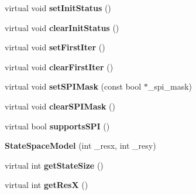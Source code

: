 \begin{DoxyCompactItemize}
\item 
\hypertarget{classStateSpaceModel_a5a7a1a38551522e1877b453062fc0f1f}{virtual void {\bfseries set\-Init\-Status} ()}\label{classStateSpaceModel_a5a7a1a38551522e1877b453062fc0f1f}

\item 
\hypertarget{classStateSpaceModel_a9d9b5a754b969d02d1881f10945baad6}{virtual void {\bfseries clear\-Init\-Status} ()}\label{classStateSpaceModel_a9d9b5a754b969d02d1881f10945baad6}

\item 
\hypertarget{classStateSpaceModel_a7b56124a6faf2aea497050f697757806}{virtual void {\bfseries set\-First\-Iter} ()}\label{classStateSpaceModel_a7b56124a6faf2aea497050f697757806}

\item 
\hypertarget{classStateSpaceModel_a6eee4ed388bc0d8c7ce0b668cb67599f}{virtual void {\bfseries clear\-First\-Iter} ()}\label{classStateSpaceModel_a6eee4ed388bc0d8c7ce0b668cb67599f}

\item 
\hypertarget{classStateSpaceModel_a437deb778661e9202e42f3a636c33dea}{virtual void {\bfseries set\-S\-P\-I\-Mask} (const bool $\ast$\-\_\-spi\-\_\-mask)}\label{classStateSpaceModel_a437deb778661e9202e42f3a636c33dea}

\item 
\hypertarget{classStateSpaceModel_a5d474f0a621659071be9bd0cdf37136d}{virtual void {\bfseries clear\-S\-P\-I\-Mask} ()}\label{classStateSpaceModel_a5d474f0a621659071be9bd0cdf37136d}

\item 
\hypertarget{classStateSpaceModel_a43c5fa9bdbd4d33422102da5112b7cc7}{virtual bool {\bfseries supports\-S\-P\-I} ()}\label{classStateSpaceModel_a43c5fa9bdbd4d33422102da5112b7cc7}

\item 
\hypertarget{classStateSpaceModel_a886da7a357a17c286a8bac0149aeb5e8}{{\bfseries State\-Space\-Model} (int \-\_\-resx, int \-\_\-resy)}\label{classStateSpaceModel_a886da7a357a17c286a8bac0149aeb5e8}

\item 
\hypertarget{classStateSpaceModel_af7538994ee27fdee4a6686430a1cb6b4}{virtual int {\bfseries get\-State\-Size} ()}\label{classStateSpaceModel_af7538994ee27fdee4a6686430a1cb6b4}

\item 
\hypertarget{classStateSpaceModel_a3875e11548ec9236bb203aee44b28070}{virtual int {\bfseries get\-Res\-X} ()}\label{classStateSpaceModel_a3875e11548ec9236bb203aee44b28070}


\end{DoxyCompactItemize}

